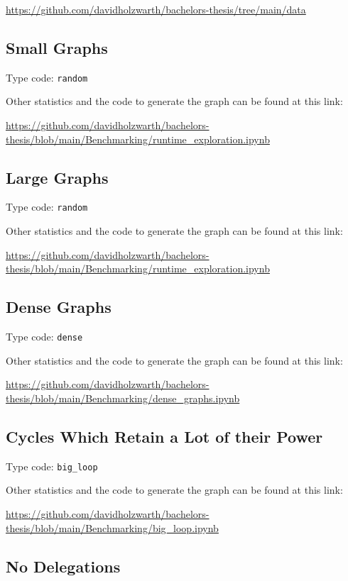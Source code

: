 \url{https://github.com/davidholzwarth/bachelors-thesis/tree/main/data}

\subsection{Small Graphs}

Type code: \texttt{random}

Other statistics and the code to generate the graph can be found at this link: 

\url{https://github.com/davidholzwarth/bachelors-thesis/blob/main/Benchmarking/runtime_exploration.ipynb}

\subsection{Large Graphs}

Type code: \texttt{random}

Other statistics and the code to generate the graph can be found at this link: 

\url{https://github.com/davidholzwarth/bachelors-thesis/blob/main/Benchmarking/runtime_exploration.ipynb}

\subsection{Dense Graphs}

Type code: \texttt{dense}

Other statistics and the code to generate the graph can be found at this link: 

\url{https://github.com/davidholzwarth/bachelors-thesis/blob/main/Benchmarking/dense_graphs.ipynb}

\subsection{Cycles Which Retain a Lot of their Power}

Type code: \texttt{big\_loop}

Other statistics and the code to generate the graph can be found at this link: 

\url{https://github.com/davidholzwarth/bachelors-thesis/blob/main/Benchmarking/big_loop.ipynb}

\subsection{No Delegations}

